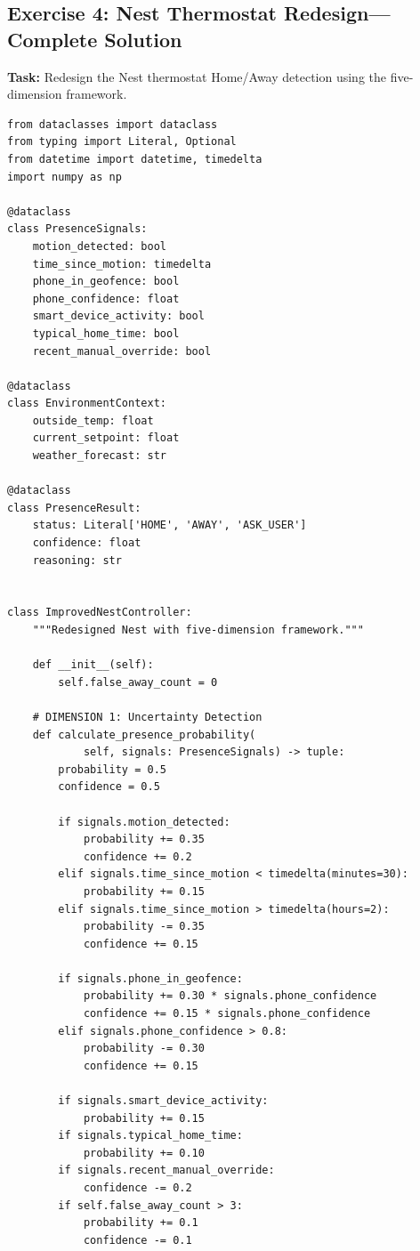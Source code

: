 \subsection{Exercise 4: Nest Thermostat Redesign---Complete Solution}

\textbf{Task:} Redesign the Nest thermostat Home/Away detection using the five-dimension framework.

\begin{lstlisting}[style=python, caption={Complete ImprovedNestController implementation}]
from dataclasses import dataclass
from typing import Literal, Optional
from datetime import datetime, timedelta
import numpy as np

@dataclass
class PresenceSignals:
    motion_detected: bool
    time_since_motion: timedelta
    phone_in_geofence: bool
    phone_confidence: float
    smart_device_activity: bool
    typical_home_time: bool
    recent_manual_override: bool

@dataclass
class EnvironmentContext:
    outside_temp: float
    current_setpoint: float
    weather_forecast: str

@dataclass
class PresenceResult:
    status: Literal['HOME', 'AWAY', 'ASK_USER']
    confidence: float
    reasoning: str


class ImprovedNestController:
    """Redesigned Nest with five-dimension framework."""

    def __init__(self):
        self.false_away_count = 0

    # DIMENSION 1: Uncertainty Detection
    def calculate_presence_probability(
            self, signals: PresenceSignals) -> tuple:
        probability = 0.5
        confidence = 0.5

        if signals.motion_detected:
            probability += 0.35
            confidence += 0.2
        elif signals.time_since_motion < timedelta(minutes=30):
            probability += 0.15
        elif signals.time_since_motion > timedelta(hours=2):
            probability -= 0.35
            confidence += 0.15

        if signals.phone_in_geofence:
            probability += 0.30 * signals.phone_confidence
            confidence += 0.15 * signals.phone_confidence
        elif signals.phone_confidence > 0.8:
            probability -= 0.30
            confidence += 0.15

        if signals.smart_device_activity:
            probability += 0.15
        if signals.typical_home_time:
            probability += 0.10
        if signals.recent_manual_override:
            confidence -= 0.2
        if self.false_away_count > 3:
            probability += 0.1
            confidence -= 0.1


\end{lstlisting}
